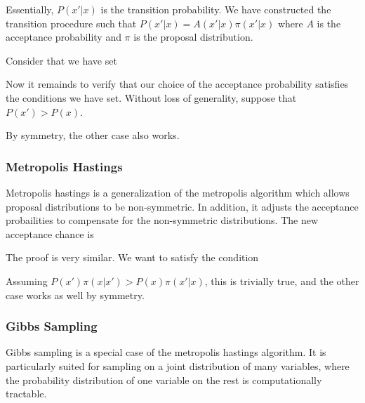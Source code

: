 \documentclass[12pt]{article}
\begin{document}
Essentially, $P(x'|x)$ is the transition probability. We have constructed the transition procedure such that $P(x'|x) = A(x'|x) \pi(x'|x)$ where $A$ is the acceptance probability and $\pi$ is the proposal distribution.


Consider that we have set


Now it remainds to verify that our choice of the acceptance probability satisfies the conditions we have set. Without loss of generality, suppose that $P(x') > P(x)$.


By symmetry, the other case also works.

\subsubsection{Metropolis Hastings}

Metropolis hastings is a generalization of the metropolis algorithm which allows proposal distributions to be non-symmetric. In addition, it adjusts the acceptance probailities to compensate for the non-symmetric distributions. The new acceptance chance is


The proof is very similar. We want to satisfy the condition


Assuming $P(x')\pi(x|x') > P(x)\pi(x'|x)$, this is trivially true, and the other case works as well by symmetry. 

\subsubsection{Gibbs Sampling}

Gibbs sampling is a special case of the metropolis hastings algorithm. It is particularly suited for sampling on a joint distribution of many variables, where the probability distribution of one variable on the rest is computationally tractable.
\end{document}
